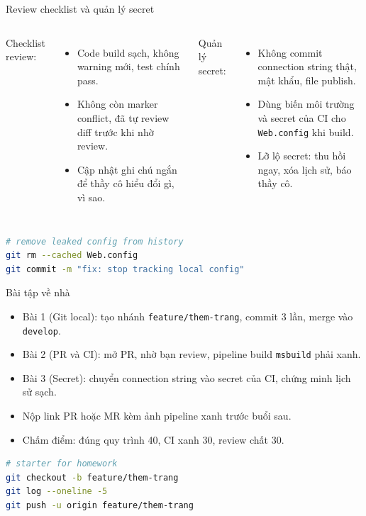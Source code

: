 \begin{frame}[fragile]{Review checklist và quản lý secret}
\begin{columns}[t]
Checklist review:
\begin{itemize}
\item Code build sạch, không warning mới, test chính pass.
\item Không còn marker conflict, đã tự review diff trước khi nhờ review.
\item Cập nhật ghi chú ngắn để thầy cô hiểu đổi gì, vì sao.
\end{itemize}
Quản lý secret:
\begin{itemize}
\item Không commit connection string thật, mật khẩu, file publish.
\item Dùng biến môi trường và secret của CI cho \texttt{Web.config} khi build.
\item Lỡ lộ secret: thu hồi ngay, xóa lịch sử, báo thầy cô.
\end{itemize}
\end{columns}
\begin{lstlisting}[language=bash]
# remove leaked config from history
git rm --cached Web.config
git commit -m "fix: stop tracking local config"
\end{lstlisting}
\end{frame}

\begin{frame}[fragile]{Bài tập về nhà}
\begin{itemize}
\item Bài 1 (Git local): tạo nhánh \texttt{feature/them-trang}, commit 3 lần, merge vào \texttt{develop}.
\item Bài 2 (PR và CI): mở PR, nhờ bạn review, pipeline build \texttt{msbuild} phải xanh.
\item Bài 3 (Secret): chuyển connection string vào secret của CI, chứng minh lịch sử sạch.
\item Nộp link PR hoặc MR kèm ảnh pipeline xanh trước buổi sau.
\item Chấm điểm: đúng quy trình 40, CI xanh 30, review chất 30.
\end{itemize}
\begin{lstlisting}[language=bash]
# starter for homework
git checkout -b feature/them-trang
git log --oneline -5
git push -u origin feature/them-trang
\end{lstlisting}
\end{frame}